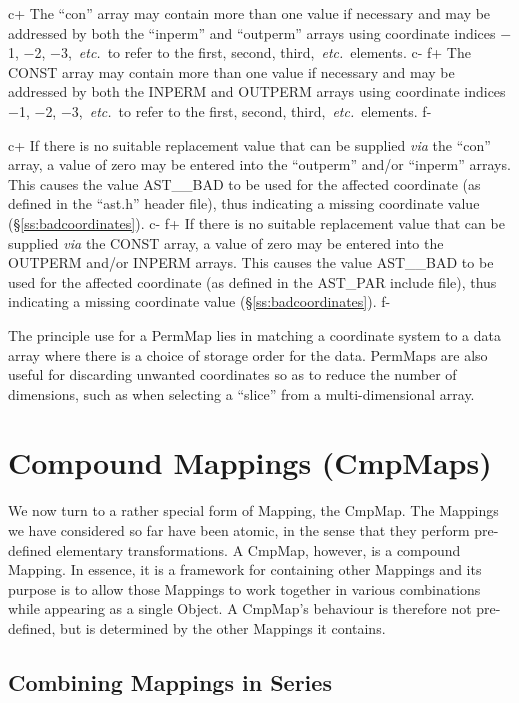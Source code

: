 \documentclass[twoside,11pt]{starlink}
\providecommand{\secref}[1]{\S\ref{#1}}
\begin{document}
c+
The ``con'' array may contain more than one value if necessary and may
be addressed by both the ``inperm'' and ``outperm'' arrays using
coordinate indices $-$1, $-$2, $-$3,~\emph{etc.}\ to refer to the
first, second, third,~\emph{etc.}\ elements.
c-
f+
The CONST array may contain more than one value if necessary and may
be addressed by both the INPERM and OUTPERM arrays using coordinate
indices $-$1, $-$2, $-$3,~\emph{etc.}\ to refer to the first, second,
third,~\emph{etc.}\ elements.
f-

c+
If there is no suitable replacement value that can be supplied
\emph{via} the ``con'' array, a value of zero may be entered into the
``outperm'' and/or ``inperm'' arrays. This causes the value AST\_\_BAD
to be used for the affected coordinate (as defined in the ``ast.h''
header file), thus indicating a missing coordinate value
(\secref{ss:badcoordinates}).
c-
f+
If there is no suitable replacement value that can be supplied
\emph{via} the CONST array, a value of zero may be entered into the
OUTPERM and/or INPERM arrays. This causes the value AST\_\_BAD to be
used for the affected coordinate (as defined in the AST\_PAR include
file), thus indicating a missing coordinate value
(\secref{ss:badcoordinates}).
f-

The principle use for a PermMap lies in matching a coordinate system
to a data array where there is a choice of storage order for the data.
PermMaps are also useful for discarding unwanted coordinates so as to
reduce the number of dimensions, such as when selecting a ``slice''
from a multi-dimensional array.

\cleardoublepage
\section{\label{ss:cmpmaps}Compound Mappings (CmpMaps)}

We now turn to a rather special form of Mapping, the CmpMap. The
Mappings we have considered so far have been atomic, in the sense that
they perform pre-defined elementary transformations. A CmpMap,
however, is a compound Mapping. In essence, it is a framework for
containing other Mappings and its purpose is to allow those Mappings
to work together in various combinations while appearing as a single
Object. A CmpMap's behaviour is therefore not pre-defined, but is
determined by the other Mappings it contains.

\subsection{\label{ss:seriescmpmap}Combining Mappings in Series}
\end{document}
